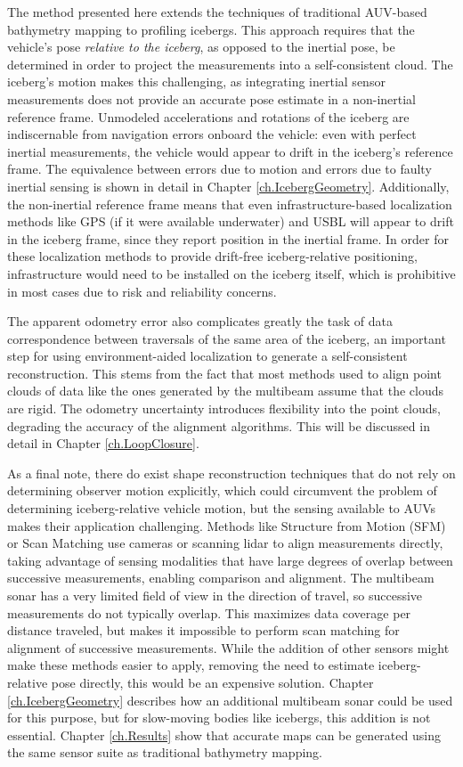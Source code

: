 The method presented here extends the techniques of traditional AUV-based bathymetry mapping to profiling icebergs. This approach requires that the vehicle's pose \emph{relative to the iceberg}, as opposed to the inertial pose, be determined in order to project the measurements into a self-consistent cloud. The iceberg's motion makes this challenging, as integrating inertial sensor measurements does not provide an accurate pose estimate in a non-inertial reference frame. Unmodeled accelerations and rotations of the iceberg are indiscernable from navigation errors onboard the vehicle: even with perfect inertial measurements, the vehicle would appear to drift in the iceberg's reference frame. The equivalence between errors due to motion and errors due to faulty inertial sensing is shown in detail in Chapter \ref{ch.IcebergGeometry}. Additionally, the non-inertial reference frame means that even infrastructure-based localization methods like GPS (if it were available underwater) and USBL will appear to drift in the iceberg frame, since they report position in the inertial frame. In order for these localization methods to provide drift-free iceberg-relative positioning, infrastructure would need to be installed on the iceberg itself, which is prohibitive in most cases due to risk and reliability concerns. 

The apparent odometry error also complicates greatly the task of data correspondence between traversals of the same area of the iceberg, an important step for using environment-aided localization to generate a self-consistent reconstruction. This stems from the fact that most methods used to align point clouds of data like the ones generated by the multibeam assume that the clouds are rigid. The odometry uncertainty introduces flexibility into the point clouds, degrading the accuracy of the alignment algorithms. This will be discussed in detail in Chapter \ref{ch.LoopClosure}.

As a final note, there do exist shape reconstruction techniques that do not rely on determining observer motion explicitly, which could circumvent the problem of determining iceberg-relative vehicle motion, but the sensing available to AUVs makes their application challenging. Methods like Structure from Motion (SFM) \cite{Sturm1996} or Scan Matching  \cite{Gutmann1996} use cameras or scanning lidar to align measurements directly, taking advantage of sensing modalities that have large degrees of overlap between successive measurements, enabling comparison and alignment. The multibeam sonar has a very limited field of view in the direction of travel, so successive measurements do not typically overlap. This maximizes data coverage per distance traveled, but makes it impossible to perform scan matching for alignment of successive measurements. While the addition of other sensors might make these methods easier to apply, removing the need to estimate iceberg-relative pose directly, this would be an expensive solution. Chapter \ref{ch.IcebergGeometry} describes how an additional multibeam sonar could be used for this purpose, but for slow-moving bodies like icebergs, this addition is not essential. Chapter \ref{ch.Results} show that accurate maps can be generated using the same sensor suite as traditional bathymetry mapping.

